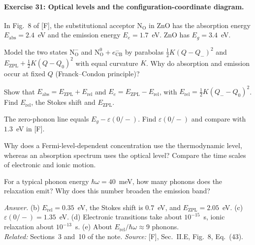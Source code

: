 \documentclass[11pt]{article}      %
\numberwithin{equation}{section}   %
\begin{document}
\paragraph{Exercise 31: Optical levels and the configuration-coordinate diagram.}
In Fig.~8 of [F], the substitutional acceptor $\text{N}_{\text{O}}$ in ZnO has the absorption energy $E_{\text{abs}} = 2.4$~eV and the emission energy $E_e = 1.7$~eV. ZnO has $E_g = 3.4$~eV.
\begin{parts}
    \item Model the two states $\text{N}_{\text{O}}^-$ and $\text{N}_{\text{O}}^0 + e^-_{\text{CB}}$ by parabolas $\tfrac12K(Q - Q_-)^2$ and $E_{\text{ZPL}} + \tfrac12K(Q - Q_0)^2$ with equal curvature $K$. Why do absorption and emission occur at fixed $Q$ (Franck--Condon principle)?
    \item Show that $E_{\text{abs}} = E_{\text{ZPL}} + E_{\text{rel}}$ and $E_e = E_{\text{ZPL}} - E_{\text{rel}}$, with $E_{\text{rel}} = \tfrac12K(Q_- - Q_0)^2$. Find $E_{\text{rel}}$, the Stokes shift and $E_{\text{ZPL}}$.
    \item The zero-phonon line equals $E_g - \varepsilon(0/-)$. Find $\varepsilon(0/-)$ and compare with $1.3$~eV in [F].
    \item Why does a Fermi-level-dependent concentration use the thermodynamic level, whereas an absorption spectrum uses the optical level? Compare the time scales of electronic and ionic motion.
    \item For a typical phonon energy $\hbar\omega = 40$~meV, how many phonons does the relaxation emit? Why does this number broaden the emission band?
\end{parts}
\textit{Answer.} (b) $E_{\text{rel}} = 0.35$~eV, the Stokes shift is $0.7$~eV, and $E_{\text{ZPL}} = 2.05$~eV. (c) $\varepsilon(0/-) = 1.35$~eV. (d) Electronic transitions take about $10^{-15}$~s, ionic relaxation about $10^{-13}$~s. (e) About $E_{\text{rel}}/\hbar\omega \approx 9$ phonons.\\
\textit{Related:} Sections~3 and~10 of the note. \textit{Source:} [F], Sec.~II.E, Fig.~8, Eq.~(43).
\end{document}
